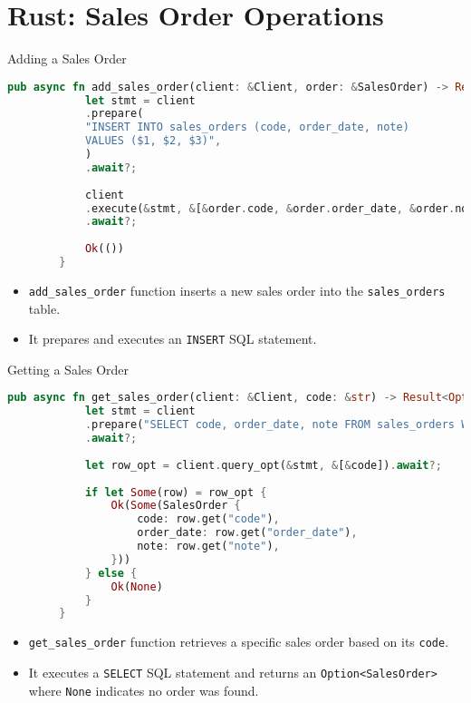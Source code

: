 \documentclass[aspectratio=169, table]{beamer}
\begin{document}
\section{Rust: Sales Order Operations}
\begin{frame}[fragile]{Adding a Sales Order}
	\begin{lstlisting}[language=Rust]
		pub async fn add_sales_order(client: &Client, order: &SalesOrder) -> Result<(), Error> {
			let stmt = client
			.prepare(
			"INSERT INTO sales_orders (code, order_date, note)
			VALUES ($1, $2, $3)",
			)
			.await?;
			
			client
			.execute(&stmt, &[&order.code, &order.order_date, &order.note])
			.await?;
			
			Ok(())
		}
	\end{lstlisting}
	
	\begin{itemize}
		\item \texttt{add\_sales\_order} function inserts a new sales order into the \texttt{sales\_orders} table.
		\item It prepares and executes an \texttt{INSERT} SQL statement.
	\end{itemize}
\end{frame}

\begin{frame}[fragile]{Getting a Sales Order}
	\begin{lstlisting}[language=Rust]
		pub async fn get_sales_order(client: &Client, code: &str) -> Result<Option<SalesOrder>, Error> {
			let stmt = client
			.prepare("SELECT code, order_date, note FROM sales_orders WHERE code = $1")
			.await?;
			
			let row_opt = client.query_opt(&stmt, &[&code]).await?;
			
			if let Some(row) = row_opt {
				Ok(Some(SalesOrder {
					code: row.get("code"),
					order_date: row.get("order_date"),
					note: row.get("note"),
				}))
			} else {
				Ok(None)
			}
		}
	\end{lstlisting}
	
	\begin{itemize}
		\item \texttt{get\_sales\_order} function retrieves a specific sales order based on its \texttt{code}.
		\item It executes a \texttt{SELECT} SQL statement and returns an \texttt{Option<SalesOrder>} where \texttt{None} indicates no order was found.
	\end{itemize}
\end{frame}
\end{document}
